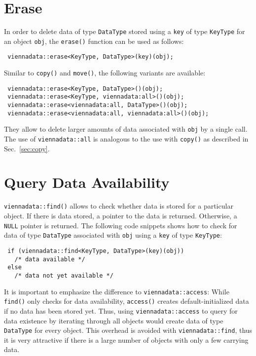 \section{Erase}
In order to delete data of type \lstinline|DataType| stored using a \lstinline|key| of type \lstinline|KeyType| for an object \lstinline|obj|,
the \lstinline|erase()| function can be used as follows:
\begin{lstlisting}
 viennadata::erase<KeyType, DataType>(key)(obj);
\end{lstlisting}
Similar to \lstinline|copy()| and \lstinline|move()|, the following variants are available:
\begin{lstlisting}
 viennadata::erase<KeyType, DataType>()(obj);
 viennadata::erase<KeyType, viennadata:all>()(obj);
 viennadata::erase<viennadata:all, DataType>()(obj);
 viennadata::erase<viennadata:all, viennadata:all>()(obj);
\end{lstlisting}
They allow to delete larger amounts of data associated with \lstinline|obj| by a single call.
The use of \lstinline|viennadata::all| is analogous to the use with \lstinline|copy()| as described in Sec.~\ref{sec:copy}.

\section{Query Data Availability}
\lstinline|viennadata::find()| allows to check whether data is stored for a particular object. If there is data stored, a pointer to the data is returned. Otherwise, a \lstinline|NULL| pointer is returned.
The following code snippets shows how to check for data of type \lstinline|DataType| associated with \lstinline|obj| using a \lstinline|key| of type \lstinline|KeyType|:
\begin{lstlisting}
 if (viennadata::find<KeyType, DataType>(key)(obj))
   /* data available */
 else
   /* data not yet available */
\end{lstlisting}

It is important to emphasize the difference to \lstinline|viennadata::access|: While \lstinline|find()| only checks for data availability, \lstinline|access()| creates default-initialized data if no data has been stored yet. Thus, using \lstinline|viennadata::access| to query for data existence by iterating through all objects would create data of type \lstinline|DataType| for every object. This overhead is avoided with \lstinline|viennadata::find|, thus it is very attractive if there is a large number of objects with only a few carrying data.

